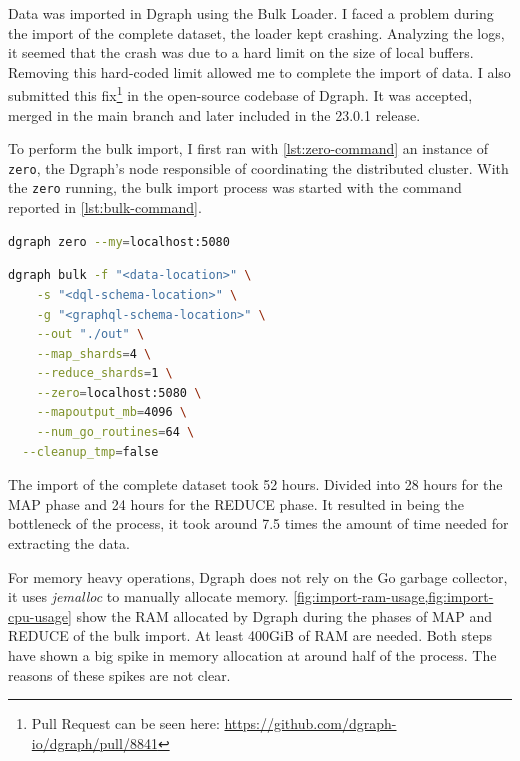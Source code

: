 Data was imported in Dgraph using the Bulk Loader. I faced a problem during the import of the complete dataset, the loader kept crashing. Analyzing the logs, it seemed that the crash was due to a hard limit on the size of local buffers. Removing this hard-coded limit allowed me to complete the import of data. I also submitted this fix\footnote{Pull Request can be seen here: \url{https://github.com/dgraph-io/dgraph/pull/8841}} in the open-source codebase of Dgraph. It was accepted, merged in the main branch and later included in the 23.0.1 release.

To perform the bulk import, I first ran with \cref{lst:zero-command} an instance of {\tt zero}, the Dgraph's node responsible of coordinating the distributed cluster. With the {\tt zero} running, the bulk import process was started with the command reported in \cref{lst:bulk-command}.

\begin{lstlisting}[language=Bash,caption={Command used for running {\tt zero}.},label={lst:zero-command},captionpos=b,numbers=none]
    dgraph zero --my=localhost:5080
\end{lstlisting}

\begin{lstlisting}[language=Bash,caption={Command used for running {\tt bulk loader}.},label={lst:bulk-command},captionpos=b,numbers=none]
dgraph bulk -f "<data-location>" \
	-s "<dql-schema-location>" \
	-g "<graphql-schema-location>" \
	--out "./out" \
	--map_shards=4 \
	--reduce_shards=1 \
	--zero=localhost:5080 \
	--mapoutput_mb=4096 \
	--num_go_routines=64 \
  --cleanup_tmp=false
\end{lstlisting}

The import of the complete dataset took 52 hours. Divided into 28 hours for the MAP phase and 24 hours for the REDUCE phase. It resulted in being the bottleneck of the process, it took around 7.5 times the amount of time needed for extracting the data. 

For memory heavy operations, Dgraph does not rely on the Go garbage collector, it uses \textit{jemalloc} to manually allocate memory. \cref{fig:import-ram-usage,fig:import-cpu-usage} show the RAM allocated by Dgraph during the phases of MAP and REDUCE of the bulk import. At least 400GiB of RAM are needed. Both steps have shown a big spike in memory allocation at around half of the process. The reasons of these spikes are not clear.

